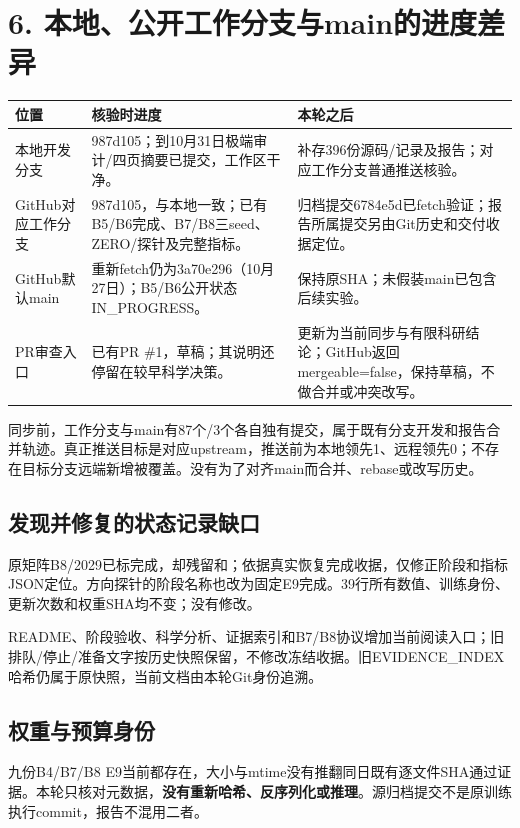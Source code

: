 \documentclass[UTF8,a4paper,10pt,fontset=none]{ctexart}
\begin{document}
\clearpage
\section*{6. 本地、公开工作分支与main的进度差异}

\begin{center}\small
\begin{tabular}{@{}p{32mm}p{67mm}p{67mm}@{}}
\toprule
位置 & 核验时进度 & 本轮之后 \\
\midrule
本地开发分支 & 987d105；到10月31日极端审计/四页摘要已提交，工作区干净。 & 补存396份源码/记录及报告；对应工作分支普通推送核验。 \\
GitHub对应工作分支 & 987d105，与本地一致；已有B5/B6完成、B7/B8三seed、ZERO/探针及完整指标。 & 归档提交6784e5d已fetch验证；报告所属提交另由Git历史和交付收据定位。 \\
GitHub默认main & 重新fetch仍为3a70e296（10月27日）；B5/B6公开状态IN\_PROGRESS。 & 保持原SHA；未假装main已包含后续实验。 \\
PR审查入口 & 已有PR \#1，草稿；其说明还停留在较早科学决策。 & 更新为当前同步与有限科研结论；GitHub返回mergeable=false，保持草稿，不做合并或冲突改写。 \\
\bottomrule
\end{tabular}\end{center}

同步前，工作分支与main有87个/3个各自独有提交，属于既有分支开发和报告合并轨迹。真正推送目标是对应upstream，推送前为本地领先1、远程领先0；不存在目标分支远端新增被覆盖。没有为了对齐main而合并、rebase或改写历史。

\subsection*{发现并修复的状态记录缺口}
原矩阵B8/2029已标完成，却残留和；依据真实恢复完成收据，仅修正阶段和指标JSON定位。方向探针的阶段名称也改为固定E9完成。39行所有数值、训练身份、更新次数和权重SHA均不变；没有修改。

README、阶段验收、科学分析、证据索引和B7/B8协议增加当前阅读入口；旧排队/停止/准备文字按历史快照保留，不修改冻结收据。旧EVIDENCE\_INDEX哈希仍属于原快照，当前文档由本轮Git身份追溯。

\subsection*{权重与预算身份}
九份B4/B7/B8 E9当前都存在，大小与mtime没有推翻同日既有逐文件SHA通过证据。本轮只核对元数据，\textbf{没有重新哈希、反序列化或推理}。源归档提交不是原训练执行commit，报告不混用二者。
\end{document}
